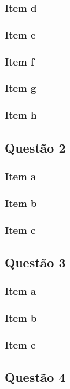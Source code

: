 \documentclass[a4paper, 12pt]{article}
\begin{document}
    \subsubsection{Item d} 
    \subsubsection{Item e} 
    \subsubsection{Item f} 
    \subsubsection{Item g} 
    \subsubsection{Item h}         
    \subsection{Quest\~{a}o 2}
    \subsubsection{Item a} 
    \subsubsection{Item b} 
    \subsubsection{Item c}     
    \subsection{Quest\~{a}o 3}
    \subsubsection{Item a} 
    \subsubsection{Item b} 
    \subsubsection{Item c}     
    \subsection{Quest\~{a}o 4}
\end{document}
